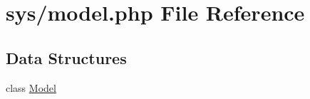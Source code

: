 \hypertarget{model_8php}{}\section{sys/model.php File Reference}
\label{model_8php}
\subsection*{Data Structures}
\begin{DoxyCompactItemize}
\item 
class \hyperlink{classModel}{Model}
\end{DoxyCompactItemize}
